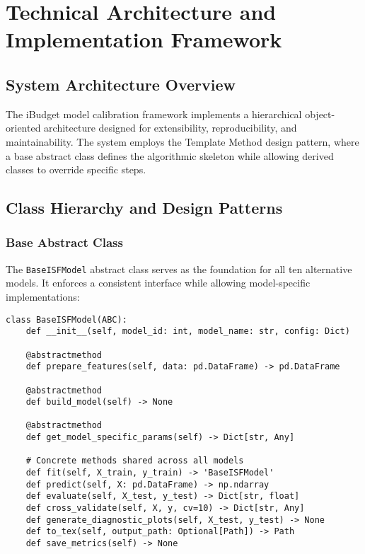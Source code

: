 \section{Technical Architecture and Implementation Framework}

\subsection{System Architecture Overview}

The iBudget model calibration framework implements a hierarchical object-oriented architecture designed for extensibility, reproducibility, and maintainability. The system employs the Template Method design pattern, where a base abstract class defines the algorithmic skeleton while allowing derived classes to override specific steps.

\subsection{Class Hierarchy and Design Patterns}

\subsubsection{Base Abstract Class}

The \texttt{BaseISFModel} abstract class serves as the foundation for all ten alternative models. It enforces a consistent interface while allowing model-specific implementations:

\begin{verbatim}
class BaseISFModel(ABC):
    def __init__(self, model_id: int, model_name: str, config: Dict)
    
    @abstractmethod
    def prepare_features(self, data: pd.DataFrame) -> pd.DataFrame
    
    @abstractmethod
    def build_model(self) -> None
    
    @abstractmethod
    def get_model_specific_params(self) -> Dict[str, Any]
    
    # Concrete methods shared across all models
    def fit(self, X_train, y_train) -> 'BaseISFModel'
    def predict(self, X: pd.DataFrame) -> np.ndarray
    def evaluate(self, X_test, y_test) -> Dict[str, float]
    def cross_validate(self, X, y, cv=10) -> Dict[str, Any]
    def generate_diagnostic_plots(self, X_test, y_test) -> None
    def to_tex(self, output_path: Optional[Path]) -> Path
    def save_metrics(self) -> None
\end{verbatim}

